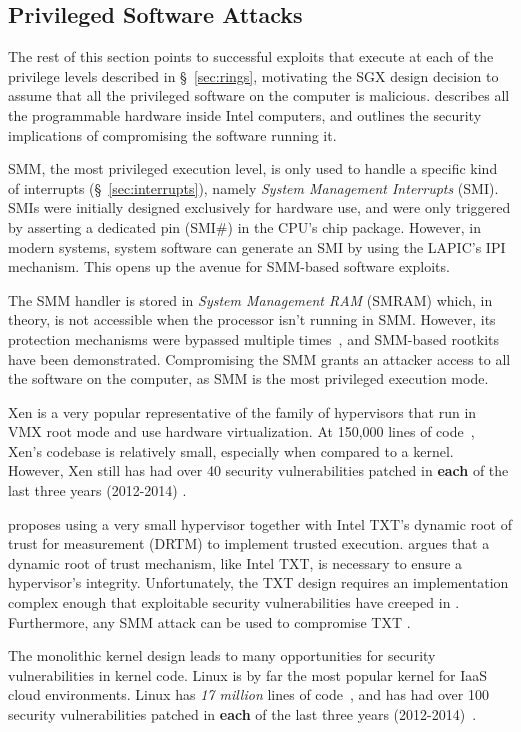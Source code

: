 \subsection{Privileged Software Attacks}
\label{sec:system_software_attacks}

The rest of this section points to successful exploits that execute at each of
the privilege levels described in \S~\ref{sec:rings}, motivating the SGX design
decision to assume that all the privileged software on the computer is
malicious. \cite{rutkowska2015intelsux} describes all the programmable hardware
inside Intel computers, and outlines the security implications of compromising
the software running it.

SMM, the most privileged execution level, is only used to handle a specific
kind of interrupts (\S~\ref{sec:interrupts}), namely
\textit{System Management Interrupts} (SMI). SMIs were initially designed
exclusively for hardware use, and were only triggered by asserting a dedicated
pin (SMI\#) in the CPU's chip package. However, in modern systems, system
software can generate an SMI by using the LAPIC's IPI mechanism. This opens up
the avenue for SMM-based software exploits.


The SMM handler is stored in  \textit{System Management RAM} (SMRAM) which, in
theory, is not accessible when the processor isn't running in SMM. However, its
protection mechanisms were bypassed multiple times~\cite{duflot2006smm,
rutkowska2008remap, wojtczuk2009smm, kallenberg2014smm}, and SMM-based
rootkits~\cite{wecherowski2009smm, embleton2010smm} have been demonstrated.
Compromising the SMM grants an attacker access to all the software on the
computer, as SMM is the most privileged execution mode.

Xen \cite{zhang2008xen} is a very popular representative of the family of
hypervisors that run in VMX root mode and use hardware virtualization. At
150,000 lines of code~\cite{xen2015loc}, Xen's codebase is relatively small,
especially when compared to a kernel. However, Xen still has had over 40
security vulnerabilities patched in \textbf{each} of the last three years
(2012-2014) \cite{cvedetails2014xen}.

\cite{mccune2010trustvisor} proposes using a very small hypervisor together
with Intel TXT's dynamic root of trust for measurement (DRTM) to implement
trusted execution. \cite{vasudevan2010requirements} argues that a dynamic root
of trust mechanism, like Intel TXT, is necessary to ensure a hypervisor's
integrity.  Unfortunately, the TXT design requires an implementation complex
enough that exploitable security vulnerabilities have creeped in
\cite{wojtczuk2009txt2, wojtczuk2011txt}. Furthermore, any SMM attack can be
used to compromise TXT \cite{wojtczuk2009txt}.

The monolithic kernel design leads to many opportunities for security
vulnerabilities in kernel code. Linux is by far the most popular kernel for
IaaS cloud environments. Linux has \emph{17 million} lines of
code~\cite{anthony2014linuxsize}, and  has had over 100 security
vulnerabilities patched in \textbf{each} of the last three years
(2012-2014)~\cite{cvedetails2014linux, chen2011linux}.
